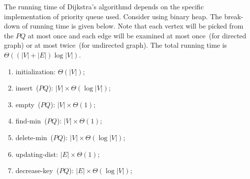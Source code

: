 The running time of Dijkstra's algorithmd depends on the specific implementation of priority queue used.
Consider using binary heap. The break-down of running time is given below.
Note that each vertex will be picked from the $PQ$ at most once and each edge will be examined at most once~(for directed graph) or at most twice~(for undirected graph).
The total running time is $\Theta((|V|+|E|)\log |V|)$.
\vspace*{-\topsep}
\begin{enumerate}
\item initialization: $\Theta(|V|)$;
\item insert~($PQ$): $|V| \times \Theta(\log |V|)$;
\item empty~($PQ$): $|V| \times \Theta(1)$;
\item find-min~($PQ$): $|V| \times \Theta(1)$;
\item delete-min~($PQ$): $|V| \times \Theta(\log |V|)$;
\item updating-dist: $|E| \times \Theta(1)$;
\item decrease-key~($PQ$): $|E| \times \Theta(\log |V|)$;
\end{enumerate}


